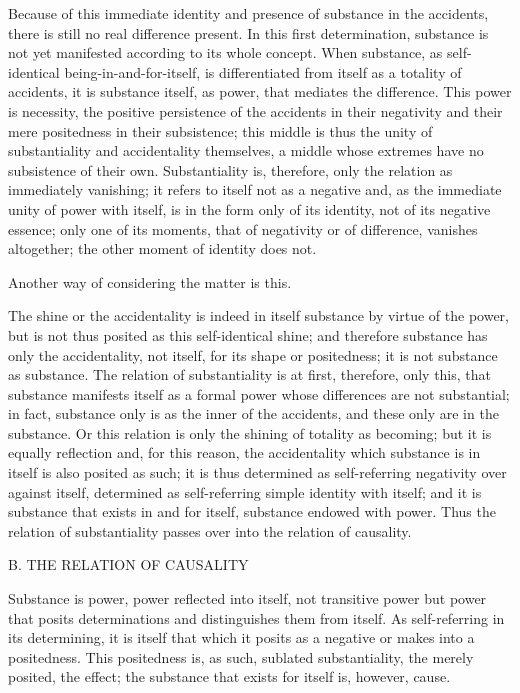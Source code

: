 Because of this immediate identity and presence
of substance in the accidents,
there is still no real difference present.
In this first determination, substance is not yet manifested
according to its whole concept.
When substance, as self-identical being-in-and-for-itself,
is differentiated from itself as a totality of accidents,
it is substance itself, as power, that mediates the difference.
This power is necessity, the positive persistence
of the accidents in their negativity
and their mere positedness in their subsistence;
this middle is thus the unity of
substantiality and accidentality themselves,
a middle whose extremes have no subsistence of their own.
Substantiality is, therefore, only the relation as immediately vanishing;
it refers to itself not as a negative
and, as the immediate unity of power with itself,
is in the form only of its identity,
not of its negative essence;
only one of its moments, that of negativity or of difference,
vanishes altogether;
the other moment of identity does not.

Another way of considering the matter is this.

The shine or the accidentality is indeed in itself substance by virtue of the power,
but is not thus posited as this self-identical shine;
and therefore substance has only the accidentality,
not itself, for its shape or positedness;
it is not substance as substance.
The relation of substantiality is at first, therefore, only this,
that substance manifests itself as a formal power
whose differences are not substantial;
in fact, substance only is as the inner of the accidents,
and these only are in the substance.
Or this relation is only the shining of totality as becoming;
but it is equally reflection and, for this reason,
the accidentality which substance is in itself is also posited as such;
it is thus determined as self-referring negativity over against itself,
determined as self-referring simple identity with itself;
and it is substance that exists in and for itself,
substance endowed with power.
Thus the relation of substantiality passes over
into the relation of causality.

B. THE RELATION OF CAUSALITY

Substance is power, power reflected into itself,
not transitive power but power that posits determinations
and distinguishes them from itself.
As self-referring in its determining,
it is itself that which it posits as a negative
or makes into a positedness.
This positedness is, as such, sublated substantiality,
the merely posited, the effect;
the substance that exists for itself is, however, cause.

